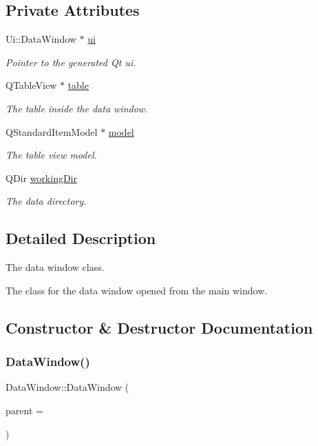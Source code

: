 \subsection*{Private Attributes}
\begin{DoxyCompactItemize}
\item 
Ui\+::\+Data\+Window $\ast$ \hyperlink{class_data_window_a4d726a6dde12dc2af17bca22573bd69b}{ui}
\begin{DoxyCompactList}\small\item\em Pointer to the generated Qt ui. \end{DoxyCompactList}\item 
Q\+Table\+View $\ast$ \hyperlink{class_data_window_ade51aa7748850fd9cef283dbb771b083}{table}
\begin{DoxyCompactList}\small\item\em The table inside the data window. \end{DoxyCompactList}\item 
Q\+Standard\+Item\+Model $\ast$ \hyperlink{class_data_window_a29b749f31459b7bf9a8a16d69fafabf9}{model}
\begin{DoxyCompactList}\small\item\em The table view model. \end{DoxyCompactList}\item 
Q\+Dir \hyperlink{class_data_window_a9681d374d6efb060c5369da1a035ec74}{working\+Dir}
\begin{DoxyCompactList}\small\item\em The data directory. \end{DoxyCompactList}\end{DoxyCompactItemize}


\subsection{Detailed Description}
The data window class. 

The class for the data window opened from the main window. 

\subsection{Constructor \& Destructor Documentation}
\mbox{\label{class_data_window_aa4f27d2945b5cf6dd26e8b73bbc8aaa0}} 
\subsubsection{\texorpdfstring{Data\+Window()}{DataWindow()}}
{\footnotesize\ttfamily Data\+Window\+::\+Data\+Window (\begin{DoxyParamCaption}\item[{Q\+Widget $\ast$}]{parent = {} }\end{DoxyParamCaption})\hspace{0.3cm}{\ttfamily [explicit]}}



